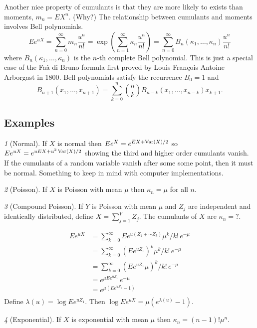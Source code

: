 \documentclass[11pt]{article}
\newcommand{\Var}{\mathop{\rm{Var}}}
\theoremstyle{remark}
\newtheorem*{example}{}
\begin{document}
Another nice property of cumulants is that they are more likely
to exists than moments, \(m_n = EX^n\). (Why?)
The relationship between cumulants and moments involves Bell polynomials\cite{?}.
\[
Ee^{uX} = \sum_{n=0}^\infty m_n \frac{u^n}{n!}
 = \exp(\sum_{n=1}^\infty \kappa_n \frac{u^n}{n!})
= \sum_{n=0}^\infty B_n(\kappa_1,\dots,\kappa_n) \frac{u^n}{n!}
\]
where \(B_n(\kappa_1,\dots,\kappa_n)\) is the \(n\)-th complete
Bell polynomial.
This is just a special case of the
Fa\`a di Bruno formula first proved by Louis Fran\c{c}ois Antoine
Arborgast in 1800\cite{Arborgast}.
Bell polynomials satisfy the recurrence \cite{Comtet} \(B_0 = 1\) and
\[
B_{n+1}(x_1,\dots,x_{n+1}) = \sum_{k=0}^n \binom{n}{k}
B_{n - k}(x_1,\dots, x_{n - k}) x_{k+1}.
\]

\subsection{Examples}
\begin{example}[Normal]
If \(X\) is normal then \(Ee^X = e^{E X + \Var(X)/2}\) so
\(Ee^{uX} = e^{uEX + u^2\Var(X)/2}\) showing the
third and higher order cumulants vanish. If the cumulants of
a random variable vanish after some some point, then it must
be normal\cite{?}. Something to keep in mind with computer
implementations.
\end{example}
\begin{example}[Poisson]
If \(X\) is Poisson
with mean \(\mu\) then \(\kappa_n = \mu\) for all \(n\).
\end{example}
\begin{example}[Compound Poisson]
If \(Y\) is Poisson with mean \(\mu\) and \(Z_j\) are
independent and identically distributed, define
\(X = \sum_{j=1}^{Y} Z_j\). The cumulants of \(X\)
are \(\kappa_n = ?\).
\end{example}
\begin{align*}
Ee^{uX} &= \sum_{k=0}^\infty Ee^{u(Z_1 + \cdots Z_k)}\mu^k/k!\,e^{-\mu}\\
&= \sum_{k=0}^\infty (Ee^{u Z_1})^k\mu^k/k!\,e^{-\mu}\\
&= \sum_{k=0}^\infty (Ee^{u Z_1}\mu)^k/k!\,e^{-\mu}\\
&= e^{\mu Ee^{u Z_1}}\,e^{-\mu}\\
&= e^{\mu (Ee^{u Z_1} - 1)}\\
\end{align*}
Define \(\lambda(u) = \log Ee^{uZ_1}\). Then
\(\log E e^{uX} = \mu(e^{\lambda(u)} -1)\).
\begin{example}[Exponential]
If \(X\) is exponential with mean \(\mu\) then
\(\kappa_n = (n - 1)!\mu^n\).
\end{example}
\end{document}
